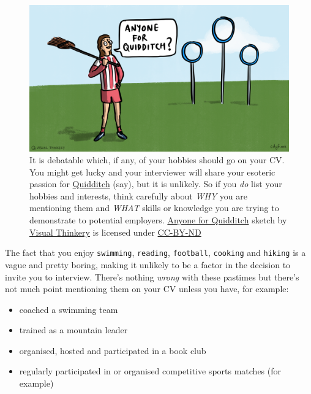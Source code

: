 \documentclass[
]{book}
\providecommand{\tightlist}{%
  \setlength{\itemsep}{0pt}\setlength{\parskip}{0pt}}
\begin{document}
\begin{figure}

{\centering \includegraphics[width=0.98\linewidth]{images/Anyone for quidditch} 

}

\caption{It is debatable which, if any, of your hobbies should go on your CV. You might get lucky and your interviewer will share your esoteric passion for \href{https://en.wikipedia.org/wiki/Quidditch_(real-life_sport)}{Quidditch} (say), but it is unlikely. \citep{quidditch} So if you \emph{do} list your hobbies and interests, think carefully about \emph{WHY} you are mentioning them and \emph{WHAT} skills or knowledge you are trying to demonstrate to potential employers. \href{https://en.wikipedia.org/wiki/Anyone_for_tennis\%3F}{Anyone for Quidditch} sketch by \href{https://visualthinkery.com/}{Visual Thinkery} is licensed under \href{https://creativecommons.org/licenses/by-nd/4.0/}{CC-BY-ND}}\label{fig:quidditch-fig}
\end{figure}



The fact that you enjoy \texttt{swimming}, \texttt{reading}, \texttt{football}, \texttt{cooking} and \texttt{hiking} is a vague and pretty boring, making it unlikely to be a factor in the decision to invite you to interview. There's nothing \emph{wrong} with these pastimes but there's not much point mentioning them on your CV unless you have, for example:

\begin{itemize}
\tightlist
\item
  coached a swimming team
\item
  trained as a mountain leader
\item
  organised, hosted and participated in a book club
\item
  regularly participated in or organised competitive sports matches (for example)
\end{itemize}
\end{document}
